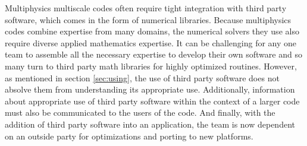 Multiphysics multiscale codes often require tight integration with third party software, which comes
in the form of numerical libraries. Because multiphysics codes combine
expertise from many domains, the numerical solvers they use also
require diverse applied mathematics expertise. It can be challenging 
for any one team to assemble all the necessary expertise to develop their own software and so many turn to third party math libraries for highly optimized routines.  However, as mentioned in section \ref{sec:using}, the use of
third party software does not absolve them from understanding its appropriate
use.  Additionally, information about appropriate use of third party
software within the context of a larger code must also be communicated
to the users of the code.  And finally, with the addition of third party software into an application, the team is now dependent on an outside party for optimizations and porting to new platforms.




